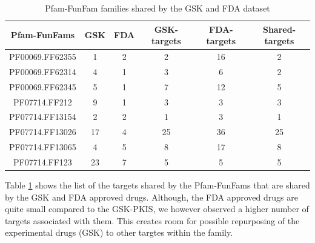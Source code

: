 \documentclass[a4paper, 11pt]{article}
\begin{document}
\begin{table}[H]
\centering
\caption{Pfam-FunFam families shared by the GSK and FDA dataset}
\label{drgfam}
\begin{tabular}{|c|c|c|c|c|c|}
\hline
Pfam-FunFams    & GSK & FDA & GSK-targets & FDA-targets & Shared-targets \\ \hline
PF00069.FF62355 & 1   & 2   & 2           & 16          & 2              \\ \hline
PF00069.FF62314 & 4   & 1   & 3           & 6           & 2              \\ \hline
PF00069.FF62345 & 5   & 1   & 7           & 12          & 5              \\ \hline
PF07714.FF212   & 9   & 1   & 3           & 3           & 3              \\ \hline
PF07714.FF13154 & 2   & 2   & 1           & 3           & 1              \\ \hline
PF07714.FF13026 & 17  & 4   & 25          & 36          & 25             \\ \hline
PF07714.FF13065 & 4   & 5   & 8           & 17          & 8              \\ \hline
PF07714.FF123   & 23  & 7   & 5           & 5           & 5              \\ \hline
\end{tabular}
\end{table}
Table \ref{drgfam} shows the list of the targets shared by the Pfam-FunFams that are shared by the GSK and FDA approved drugs. Although, the FDA approved drugs are quite small compared to the GSK-PKIS, we however observed a higher number of targets associated with them. This creates room for possible repurposing of the experimental drugs (GSK) to other targtes within the family.
\end{document}
